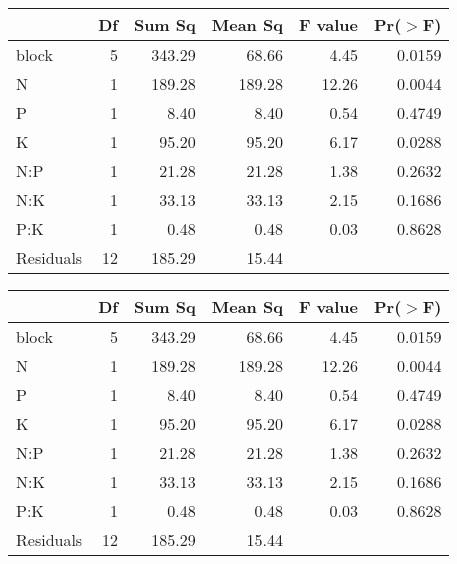 \begin{table}[ht]
\begin{center}
\begin{tabular}{lrrrrr}
  \hline
 & Df & Sum Sq & Mean Sq & F value & Pr($>$F) \\ 
  \hline
block & 5 & 343.29 & 68.66 & 4.45 & 0.0159 \\ 
  N & 1 & 189.28 & 189.28 & 12.26 & 0.0044 \\ 
  P & 1 & 8.40 & 8.40 & 0.54 & 0.4749 \\ 
  K & 1 & 95.20 & 95.20 & 6.17 & 0.0288 \\ 
  N:P & 1 & 21.28 & 21.28 & 1.38 & 0.2632 \\ 
  N:K & 1 & 33.13 & 33.13 & 2.15 & 0.1686 \\ 
  P:K & 1 & 0.48 & 0.48 & 0.03 & 0.8628 \\ 
  Residuals & 12 & 185.29 & 15.44 &  &  \\ 
   \hline
\end{tabular}
\end{center}
\end{table}
\begin{table}[ht]
\begin{center}
\begin{tabular}{lrrrrr}
  \hline
 & Df & Sum Sq & Mean Sq & F value & Pr($>$F) \\ 
  \hline
block & 5 & 343.29 & 68.66 & 4.45 & 0.0159 \\ 
  N & 1 & 189.28 & 189.28 & 12.26 & 0.0044 \\ 
  P & 1 & 8.40 & 8.40 & 0.54 & 0.4749 \\ 
  K & 1 & 95.20 & 95.20 & 6.17 & 0.0288 \\ 
  N:P & 1 & 21.28 & 21.28 & 1.38 & 0.2632 \\ 
  N:K & 1 & 33.13 & 33.13 & 2.15 & 0.1686 \\ 
  P:K & 1 & 0.48 & 0.48 & 0.03 & 0.8628 \\ 
  Residuals & 12 & 185.29 & 15.44 &  &  \\ 
   \hline
\end{tabular}
\end{center}
\end{table}
